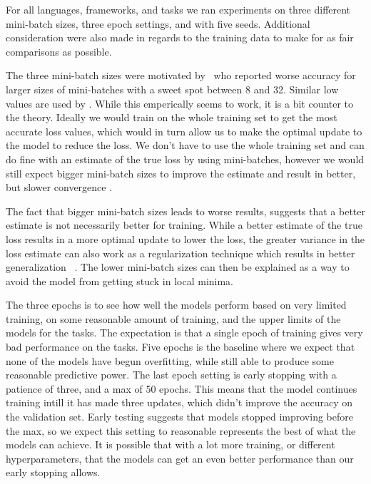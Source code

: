 For all languages, frameworks, and tasks we ran experiments on three different
mini-batch sizes, three epoch settings, and with five seeds. Additional
consideration were also made in regards to the training data to make for as fair
comparisons as possible.

The three mini-batch sizes were motivated by~\cite{reimers2017reporting} who
reported worse accuracy for larger sizes of mini-batches with a sweet spot
between 8 and 32. Similar low values are used by \cite{huang2015bidirectional}.
While this emperically seems to work, it is a bit counter to the theory. Ideally
we would train on the whole training set to get the most accurate loss values,
which would in turn allow us to make the optimal update to the model to reduce
the loss. We don't have to use the whole training set and can do fine with an
estimate of the true loss by using mini-batches, however we would still expect
bigger mini-batch sizes to improve the estimate and result in better, but slower
convergence \cite[Chapter~8.1.3]{goodfellow2016deep}.

The fact that bigger mini-batch sizes leads to worse results, suggests that a
better estimate is not necessarily better for training. While a better estimate
of the true loss results in a more optimal update to lower the loss, the greater
variance in the loss estimate can also work as a regularization technique which
results in better generalization ~\cite[pp.~279]{goodfellow2016deep}. The lower
mini-batch sizes can then be explained as a way to avoid the model from getting
stuck in local minima.

The three epochs is to see how well the models perform based on very limited
training, on some reasonable amount of training, and the upper limits of the
models for the tasks. The expectation is that a single epoch of training gives
very bad performance on the tasks. Five epochs is the baseline where we expect
that none of the models have begun overfitting, while still able to produce some
reasonable predictive power. The last epoch setting is early stopping with a
patience of three, and a max of 50 epochs. This means that the model continues
training intill it has made three updates, which didn't improve the accuracy on
the validation set. Early testing suggests that models stopped improving before
the max, so we expect this setting to reasonable represents the best of what the
models can achieve. It is possible that with a lot more training, or different
hyperparameters, that the models can get an even better performance than our
early stopping allows.

